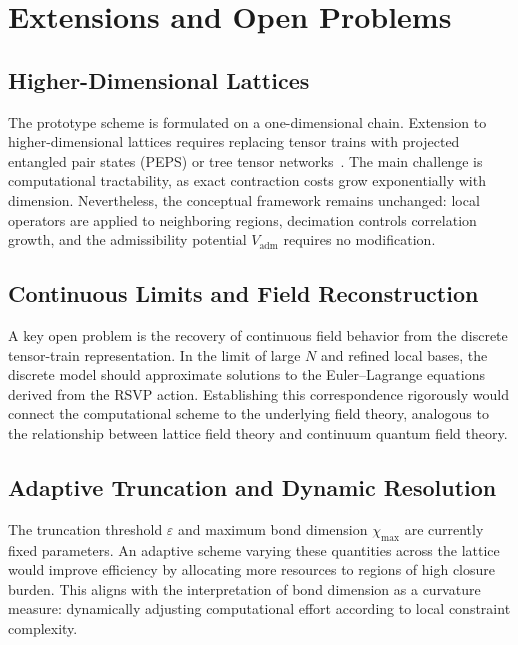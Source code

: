 \documentclass[11pt]{article}
\theoremstyle{definition}
\begin{document}
\section{Extensions and Open Problems}

\subsection{Higher-Dimensional Lattices}

The prototype scheme is formulated on a one-dimensional chain. Extension to
higher-dimensional lattices requires replacing tensor trains with projected
entangled pair states (PEPS) or tree tensor networks~\cite{orus2014tensor}.
The main challenge is computational tractability, as exact contraction costs
grow exponentially with dimension. Nevertheless, the conceptual framework
remains unchanged: local operators are applied to neighboring regions,
decimation controls correlation growth, and the admissibility potential
$V_{\mathrm{adm}}$ requires no modification.

\subsection{Continuous Limits and Field Reconstruction}

A key open problem is the recovery of continuous field behavior from the
discrete tensor-train representation. In the limit of large $N$ and refined
local bases, the discrete model should approximate solutions to the
Euler--Lagrange equations derived from the RSVP action. Establishing this
correspondence rigorously would connect the computational scheme to the
underlying field theory, analogous to the relationship between lattice field
theory and continuum quantum field theory.

\subsection{Adaptive Truncation and Dynamic Resolution}

The truncation threshold $\varepsilon$ and maximum bond dimension $\chi_{\max}$
are currently fixed parameters. An adaptive scheme varying these quantities
across the lattice would improve efficiency by allocating more resources to
regions of high closure burden. This aligns with the interpretation of bond
dimension as a curvature measure: dynamically adjusting computational effort
according to local constraint complexity.
\end{document}

